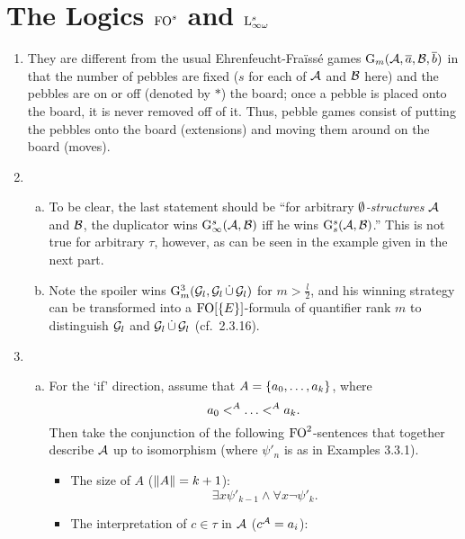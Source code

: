 \section{The Logics $\folog[s]$ and $\inflog[s]$}
\begin{enumerate}[1.]
%
\item {} They are different from the usual Ehrenfeucht-Fra\"iss\'e games $\game{m}(\strct{A}, \vect{a}, \strct{B}, \vect{b})$ in that the number of pebbles are fixed ($s$ for each of $\mathcal{A}$ and $\mathcal{B}$ here) and the pebbles are on or off (denoted by $\ast$) the board; once a pebble is placed onto the board, it is never removed off of it. Thus, pebble games consist of putting the pebbles onto the board (extensions) and moving them around on the board (moves).
%
\item {}
\begin{enumerate}[(a)]
\item To be clear, the last statement should be ``for arbitrary \emph{$\emptyset$-structures} $\mathcal{A}$ and $\mathcal{B}$, the duplicator wins $\game[s]{\infty}(\strct{A}, \strct{B})$ iff he wins $\game[s]{s}(\strct{A}, \strct{B})$.'' This is not true for arbitrary $\tau$, however, as can be seen in the example given in the next part.
\item Note the spoiler wins $\game[3]{m}(\strct{G}_l, \strct{G}_l \dunion \strct{G}_l)$ for $m > \frac{l}{2}$, and his winning strategy can be transformed into a $\folog\of{\sete{E}}$-formula of quantifier rank $m$ to distinguish $\mathcal{G}_l$ and $\mathcal{G}_l \mathop{\dot{\cup}} \mathcal{G}_l$ (cf.\ 2.3.16).
\end{enumerate}
%
\item {}
\begin{enumerate}[(a)]
\item For the `if' direction, assume that $A = {\{a_0, \ldots, a_k\}}$, where
\[
a_0 \mathrel{<^{A}} \ldots \mathrel{<^{A}} a_k.
\]
Then take the conjunction of the following $\folog[2]$-sentences that together describe $\mathcal{A}$ up to isomorphism (where $\psi'_n$ is as in Examples 3.3.1).
\begin{itemize}
\item The size of $A$ ($\|A\| = k + 1$):
\[
\exists x \psi'_{k - 1} \land \forall x \neg\psi'_k.
\]
\item The interpretation of $c \in \tau$ in $\mathcal{A}$ ($c^{\mathcal{A}} = a_i$):

\end{itemize}
\end{enumerate}
\end{enumerate}
